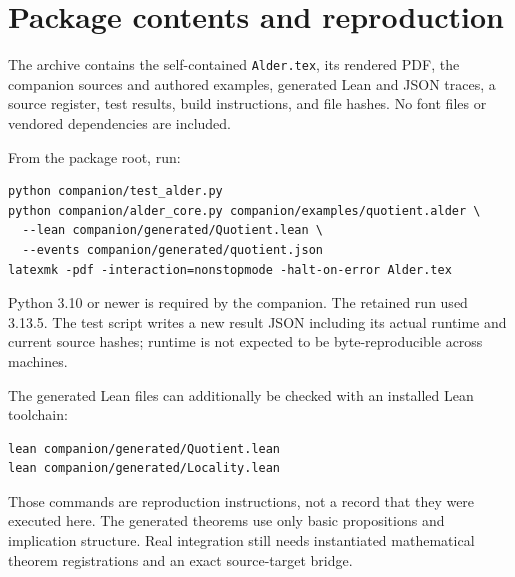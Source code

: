 \documentclass[11pt,a4paper]{article}
\newcommand{\code}[1]{\nolinkurl{#1}}
\theoremstyle{plain}
\theoremstyle{definition}
\theoremstyle{remark}
\begin{document}
\section{Package contents and reproduction}\label{app:reproduce}
The archive contains the self-contained \code{Alder.tex}, its rendered PDF, the companion sources and authored examples, generated Lean and JSON traces, a source register, test results, build instructions, and file hashes. No font files or vendored dependencies are included.

From the package root, run:
\Needspace{114pt}
\begin{lstlisting}
python companion/test_alder.py
python companion/alder_core.py companion/examples/quotient.alder \
  --lean companion/generated/Quotient.lean \
  --events companion/generated/quotient.json
latexmk -pdf -interaction=nonstopmode -halt-on-error Alder.tex
\end{lstlisting}
Python 3.10 or newer is required by the companion. The retained run used 3.13.5. The test script writes a new result JSON including its actual runtime and current source hashes; runtime is not expected to be byte-reproducible across machines.

The generated Lean files can additionally be checked with an installed Lean toolchain:
\Needspace{72pt}
\begin{lstlisting}
lean companion/generated/Quotient.lean
lean companion/generated/Locality.lean
\end{lstlisting}
Those commands are reproduction instructions, not a record that they were executed here. The generated theorems use only basic propositions and implication structure. Real integration still needs instantiated mathematical theorem registrations and an exact source-target bridge.
\end{document}
